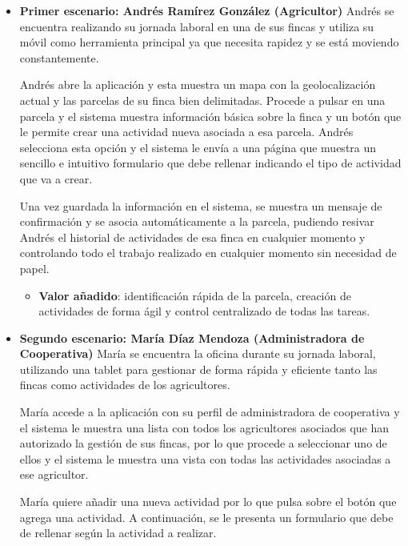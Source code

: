 \begin{itemize}
    \item \textbf{Primer escenario: Andrés Ramírez González (Agricultor)}
    \newline
    Andrés se encuentra realizando su jornada laboral en una de sus fincas y utiliza su móvil como herramienta principal 
    ya que necesita rapidez y se está moviendo constantemente.

    Andrés abre la aplicación y esta muestra un mapa con la geolocalización actual y las parcelas de su finca bien
    delimitadas. Procede a pulsar en una parcela y el sistema muestra información básica sobre la finca y un botón que le
    permite crear una actividad nueva asociada a esa parcela. Andrés selecciona esta opción y el sistema le envía a una 
    página que muestra un sencillo e intuitivo formulario que debe rellenar indicando el tipo de actividad que va a crear.

    Una vez guardada la información en el sistema, se muestra un mensaje de confirmación y se asocia automáticamente a la 
    parcela, pudiendo resivar Andrés el historial de actividades de esa finca en cualquier momento y controlando todo el 
    trabajo realizado en cualquier momento sin necesidad de papel.

    \begin{itemize}
        \item \textbf{Valor añadido}: identificación rápida de la parcela, creación de actividades de forma ágil y control
        centralizado de todas las tareas.
    \end{itemize}

    \item \textbf{Segundo escenario: María Díaz Mendoza (Administradora de Cooperativa)}
    \newline
    María se encuentra la oficina durante su jornada laboral, utilizando una tablet para gestionar de forma rápida y 
    eficiente tanto las fincas como actividades de los agricultores.

    María accede a la aplicación con su perfil de administradora de cooperativa y el sistema le muestra una lista con 
    todos los agricultores asociados que han autorizado la gestión de sus fincas, por lo que procede a seleccionar uno de ellos
    y el sistema le muestra una vista con todas las actividades asociadas a ese agricultor.

    María quiere añadir una nueva actividad por lo que pulsa sobre el botón que agrega una actividad. A continuación,
    se le presenta un formulario que debe de rellenar según la actividad a realizar.


\end{itemize}
